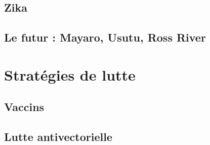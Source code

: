 \subsection{Zika}

\subsection{Le futur : Mayaro, Usutu, Ross River}

\section{Stratégies de lutte}

\subsection{Vaccins}

\subsection{Lutte antivectorielle}

%
%

